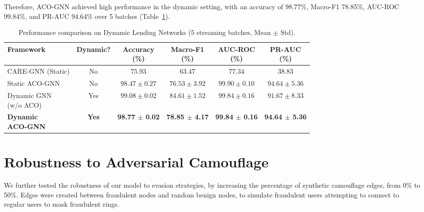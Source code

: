 Therefore, ACO-GNN achieved high performance in the dynamic setting, with an accuracy of 98.77\%, Macro-F1 78.85\%, AUC-ROC 99.84\%, and PR-AUC 94.64\% over 5 batches (Table~\ref{tab:dynamic_performance}).

\begin{table}[htbp]
\centering
\footnotesize
\setlength{\tabcolsep}{2.5pt}
\caption[Performance comparison on Dynamic Lending Networks]{Performance comparison on Dynamic Lending Networks (5 streaming batches, Mean $\pm$ Std).}
\label{tab:dynamic_performance}
\begin{tabular*}{\textwidth}{@{\extracolsep{\fill}}lccccc}
\toprule
\textbf{Framework} & \textbf{Dynamic?} & \makecell{\textbf{Accuracy}\\\textbf{(\%)}} & \makecell{\textbf{Macro-F1}\\\textbf{(\%)}} & \makecell{\textbf{AUC-ROC}\\\textbf{(\%)}} & \makecell{\textbf{PR-AUC}\\\textbf{(\%)}} \\
\midrule
CARE-GNN (Static) & No  & $75.93$ & $63.47$ & $77.34$ & $38.83$ \\
Static ACO-GNN     & No  & $98.47 \pm 0.27$ & $76.53 \pm 3.92$ & $99.90 \pm 0.10$ & $94.64 \pm 5.36$ \\
\makecell[l]{Dynamic GNN\\(w/o ACO)} & Yes & $99.08 \pm 0.02$ & $84.61 \pm 1.52$ & $99.84 \pm 0.16$ & $91.67 \pm 8.33$ \\
\makecell[l]{\textbf{Dynamic}\\\textbf{ACO-GNN}} & \textbf{Yes} & \textbf{98.77 $\pm$ 0.02} & \textbf{78.85 $\pm$ 4.17} & \textbf{99.84 $\pm$ 0.16} & \textbf{94.64 $\pm$ 5.36} \\
\bottomrule
\end{tabular*}
\end{table}

\section[Robustness to Adversarial Camouflage]{Robustness to Adversarial Camouflage}
\label{sec:stress_testing}

We further tested the robustness of our model to evasion strategies, by increasing the percentage of synthetic camouflage edges, from 0\% to 50\%. Edges were created between fraudulent nodes and random benign nodes, to simulate fraudulent users attempting to connect to regular users to mask fraudulent rings.

